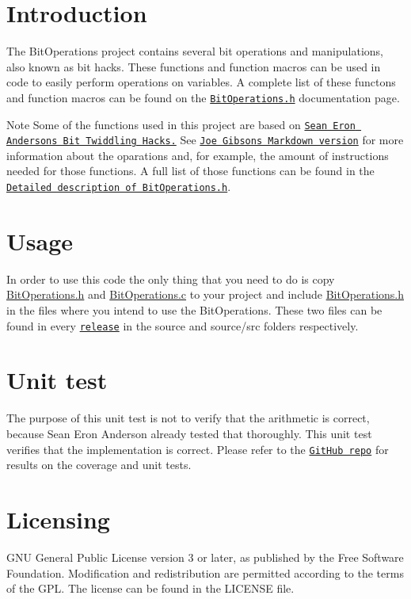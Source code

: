 \hypertarget{index_intro_sec}{}\section{Introduction}\label{index_intro_sec}
The Bit\+Operations project contains several bit operations and manipulations, also known as \textquotesingle{}bit hacks\textquotesingle{}. These functions and function macros can be used in code to easily perform operations on variables. A complete list of these functons and function macros can be found on the \href{BitOperations_8h.html}{\tt Bit\+Operations.\+h} documentation page.

\begin{DoxyNote}{Note}
Some of the functions used in this project are based on \href{https://graphics.stanford.edu/~seander/bithacks.html}{\tt Sean Eron Anderson\textquotesingle{}s Bit Twiddling Hacks.} See \href{https://github.com/gibsjose/BitHacks/blob/master/BitHacks.md}{\tt Joe Gibson\textquotesingle{}s Markdown version} for more information about the oparations and, for example, the amount of instructions needed for those functions. A full list of those functions can be found in the \href{BitOperations_8h.html#details}{\tt Detailed description of Bit\+Operations.\+h}.
\end{DoxyNote}
\hypertarget{index_usage}{}\section{Usage}\label{index_usage}
In order to use this code the only thing that you need to do is copy {\ttfamily \hyperlink{BitOperations_8h}{Bit\+Operations.\+h}} and {\ttfamily \hyperlink{BitOperations_8c}{Bit\+Operations.\+c}} to your project and include {\ttfamily \hyperlink{BitOperations_8h}{Bit\+Operations.\+h}} in the files where you intend to use the Bit\+Operations. These two files can be found in every \href{https://github.com/vidavidorra/BitOperations/releases}{\tt release} in the {\ttfamily source} and {\ttfamily source/src} folders respectively.\hypertarget{index_unit_test}{}\section{Unit test}\label{index_unit_test}
The purpose of this unit test is not to verify that the arithmetic is correct, because Sean Eron Anderson already tested that thoroughly. This unit test verifies that the implementation is correct. Please refer to the \href{https://github.com/vidavidorra/BitOperations}{\tt Git\+Hub repo} for results on the coverage and unit tests.\hypertarget{index_licensing}{}\section{Licensing}\label{index_licensing}
G\+NU General Public License version 3 or later, as published by the Free Software Foundation. Modification and redistribution are permitted according to the terms of the G\+PL. The license can be found in the {\ttfamily L\+I\+C\+E\+N\+SE} file. 